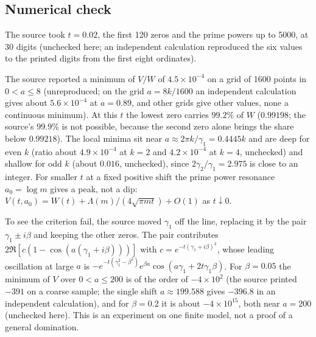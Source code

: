 \subsection{Numerical check}

\begin{resultpar}\label{wt:res:sin2}
The source took $t=0.02$, the first 120 zeros and the prime powers up to 5000, at 30 digits (unchecked here; an independent calculation reproduced the six values to the printed digits from the first eight ordinates).\end{resultpar}
\begin{center}\small
{}
\end{center}
The source reported a minimum of $V/W$ of $4.5\times10^{-4}$ on a grid of 1600 points in $0<a\le8$ (unreproduced; on the grid $a=8k/1600$ an independent calculation gives about $5.6\times10^{-4}$ at $a=0.89$, and other grids give other values, none a continuous minimum). At this $t$ the lowest zero carries $99.2\%$ of $W$ ($0.99198$; the source's $99.9\%$ is not possible, because the second zero alone brings the share below $0.99218$). The local minima sit near $a\approx2\pi k/\gamma_1=0.4445k$ and are deep for even $k$ (ratio about $4.9\times10^{-4}$ at $k=2$ and $4.2\times10^{-4}$ at $k=4$, unchecked) and shallow for odd $k$ (about $0.016$, unchecked), since $2\gamma_2/\gamma_1=2.975$ is close to an integer. For smaller $t$ at a fixed positive shift the prime power resonance $a_0=\log m$ gives a peak, not a dip: $V(t,a_0)=W(t)+\Lambda(m)/(4\sqrt{\pi mt})+O(1)$ as $t\downarrow0$.

To see the criterion fail, the source moved $\gamma_1$ off the line, replacing it by the pair $\gamma_1\pm i\beta$ and keeping the other zeros. The pair contributes $2\Re[c(1-\cos(a(\gamma_1+i\beta)))]$ with $c=e^{-t(\gamma_1+i\beta)^2}$, whose leading oscillation at large $a$ is $-e^{-t(\gamma_1^2-\beta^2)}e^{\beta a}\cos(a\gamma_1+2t\gamma_1\beta)$. For $\beta=0.05$ the minimum of $V$ over $0<a\le200$ is of the order of $-4\times10^2$ (the source printed $-391$ on a coarse sample; the single shift $a\approx199.588$ gives $-396.8$ in an independent calculation), and for $\beta=0.2$ it is about $-4\times10^{15}$, both near $a=200$ (unchecked here). This is an experiment on one finite model, not a proof of a general domination.

